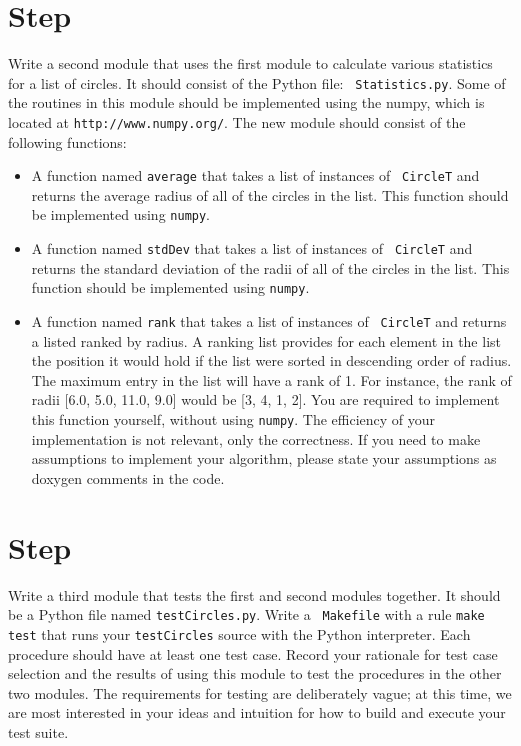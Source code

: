 \documentclass[12pt]{article}
\newcounter{stepnum}
\begin{document}
\section *{Step  \thestepnum}
Write a second module that uses the first module to calculate various statistics
for a list of circles.  It should consist of the Python file: {\tt
  Statistics.py}.  Some of the routines in this module should be implemented
using the numpy, which is located at {\tt http://www.numpy.org/}.  The new
module should consist of the following functions:
\begin{itemize}
\item A function named {\tt average} that takes a list of instances of {\tt
    CircleT} and returns the average radius of all of the circles in the list.
  This function should be implemented using {\tt numpy}.
\item A function named {\tt stdDev} that takes a list of instances of {\tt
    CircleT} and returns the standard deviation of the radii of all of the
  circles in the list.  This function should be implemented using {\tt numpy}.
\item A function named {\tt rank} that takes a list of instances of {\tt
    CircleT} and returns a listed ranked by radius.  A ranking list provides for each
  element in the list the position it would hold if the list were sorted in
  descending order of radius.  The maximum entry in the list will have a rank of 1.  For
  instance, the rank of radii [6.0, 5.0, 11.0, 9.0] would be [3, 4, 1, 2].  You are
  required to implement this function yourself, without using {\tt numpy}.  The
  efficiency of your implementation is not relevant, only the correctness.  If
  you need to make assumptions to implement your algorithm, please state your
  assumptions as doxygen comments in the code.
\end{itemize}
\section *{Step  \thestepnum}
Write a third module that tests the first and second modules together.  It
should be a Python file named {\tt testCircles.py}.  Write a {\tt
  Makefile} with a rule {\tt make test} that runs your {\tt testCircles} source
with the Python interpreter.  Each procedure should have at least
one test case.  Record your rationale for test case selection and the results of
using this module to test the procedures in the other two modules.  The
requirements for testing are deliberately vague; at this time, we are most
interested in your ideas and intuition for how to build and execute your test
suite.
\end{document}
